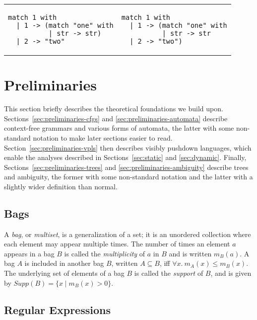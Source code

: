 \documentclass[acmsmall,review,anonymous]{acmart}\settopmatter{printfolios=true,printccs=false,printacmref=false}
\newcommand{\support}{\mathit{Supp}}
\begin{document}
\begin{center}
\begin{tabular}{l|l}
\begin{lstlisting}[language={[objective]caml}]
match 1 with
  | 1 -> (match "one" with
          | str -> str)
  | 2 -> "two"
\end{lstlisting} &
\begin{lstlisting}[language={[objective]caml}]
match 1 with
  | 1 -> (match "one" with
          | str -> str
  | 2 -> "two")
\end{lstlisting} \\
\end{tabular}
\end{center}

\section{Preliminaries}

This section briefly describes the theoretical foundations we build upon. Sections~\ref{sec:preliminaries-cfgs} and \ref{sec:preliminaries-automata} describe context-free grammars and various forms of automata, the latter with some non-standard notation to make later sections easier to read. Section~\ref{sec:preliminaries-vpls} then describes visibly pushdown languages, which enable the analyses described in Sections~\ref{sec:static} and \ref{sec:dynamic}. Finally, Sections~\ref{sec:preliminaries-trees} and \ref{sec:preliminaries-ambiguity} describe trees and ambiguity, the former with some non-standard notation and the latter with a slightly wider definition than normal.

\subsection{Bags} \label{sec:bags}

A \emph{bag}, or \emph{multiset}, is a generalization of a set; it is an unordered collection where each element may appear multiple times. The number of times an element $a$ appears in a bag $B$ is called the \emph{multiplicity} of $a$ in $B$ and is written $m_B(a)$. A bag $A$ is included in another bag $B$, written $A \subseteq B$, iff $\forall x.\ m_A(x) \leq m_B(x)$. The underlying set of elements of a bag $B$ is called the \emph{support} of $B$, and is given by $\support(B) = \{ x \mid m_B(x) > 0 \}$.

\subsection{Regular Expressions} \label{sec:preliminaries-regexes}
\end{document}
